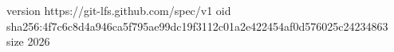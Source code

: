 version https://git-lfs.github.com/spec/v1
oid sha256:4f7c6c8d4a946ca5f795ae99dc19f3112c01a2e422454af0d576025c24234863
size 2026
